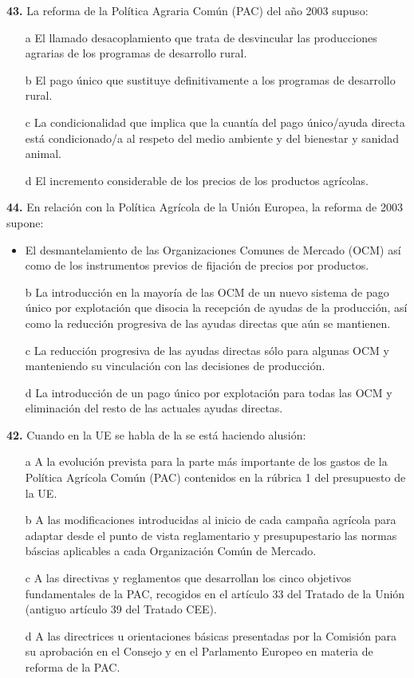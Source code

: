 \documentclass{nuevotema}
\begin{document}
\textbf{43.} La reforma de la Política Agraria Común (PAC) del año 2003 supuso:
\begin{itemize}
    \item[a] El llamado desacoplamiento que trata de desvincular las producciones agrarias de los programas de desarrollo rural.
    \item[b] El pago único que sustituye definitivamente a los programas de desarrollo rural.
    \item[c] La condicionalidad que implica que la cuantía del pago único/ayuda directa está condicionado/a al respeto del medio ambiente y del bienestar y sanidad animal.
    \item[d] El incremento considerable de los precios de los productos agrícolas.
\end{itemize}

\textbf{44.} En relación con la Política Agrícola de la Unión Europea, la reforma de 2003 supone:
\begin{itemize}
    \item El desmantelamiento de las Organizaciones Comunes de Mercado (OCM) así como de los instrumentos previos de fijación de precios por productos.
    \item[b] La introducción en la mayoría de las OCM de un nuevo sistema de pago único por explotación que disocia la recepción de ayudas de la producción, así como la reducción progresiva de las ayudas directas que aún se mantienen.
    \item[c] La reducción progresiva de las ayudas directas sólo para algunas OCM y manteniendo su vinculación con las decisiones de producción.
    \item[d] La introducción de un pago único por explotación para todas las OCM y eliminación del resto de las actuales ayudas directas.
\end{itemize}

\textbf{42.}
Cuando en la UE se habla de la  se está haciendo alusión:
\begin{enumerate}
    \item[a] A la evolución prevista para la parte más importante de los gastos de la Política Agrícola Común (PAC) contenidos en la rúbrica 1 del presupuesto de la UE.
    \item[b] A las modificaciones introducidas al inicio de cada campaña agrícola para adaptar desde el punto de vista reglamentario y presupupestario las normas báscias aplicables a cada Organización Común de Mercado.
    \item[c] A las directivas y reglamentos que desarrollan los cinco objetivos fundamentales de la PAC, recogidos en el artículo 33 del Tratado de la Unión (antiguo artículo 39 del Tratado CEE).
    \item[d] A las directrices u orientaciones básicas presentadas por la Comisión para su aprobación en el Consejo y en el Parlamento Europeo en materia de reforma de la PAC.
\end{enumerate}
\end{document}
